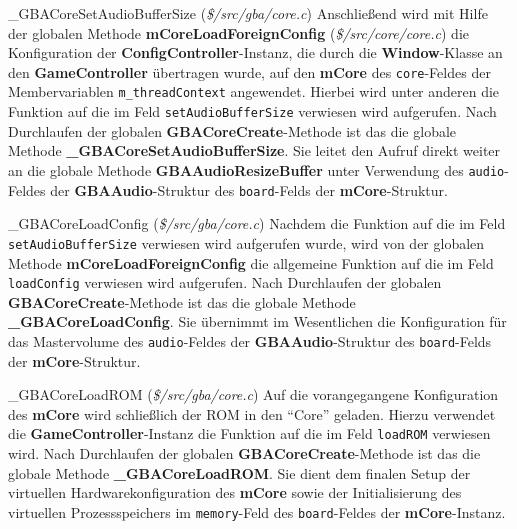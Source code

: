 \documentclass[11pt,a4paper]{scrartcl}
\begin{document}
\vspace{5mm}
\large {\_}GBACoreSetAudioBufferSize \normalsize(\textit{\$/src/gba/core.c})
\vspace{2mm}\newline
Anschlie{\ss}end wird mit Hilfe der globalen Methode \textbf{mCoreLoadForeignConfig} (\textit{\$/src/core/core.c}) die Konfiguration der \textbf{ConfigController}-Instanz, die durch die \textbf{Window}-Klasse an den \textbf{GameController} \"ubertragen wurde, auf den \textbf{mCore} des \verb|core|-Feldes der Membervariablen \verb|m_threadContext| angewendet. Hierbei wird unter anderen die Funktion auf die im Feld \verb|setAudioBufferSize| verwiesen wird aufgerufen. Nach Durchlaufen der globalen \textbf{GBACoreCreate}-Methode ist das die globale Methode \textbf{{\_}GBACoreSetAudioBufferSize}. Sie leitet den Aufruf direkt weiter an die globale Methode \textbf{GBAAudioResizeBuffer} unter Verwendung des \verb|audio|-Feldes der \textbf{GBAAudio}-Struktur des \verb|board|-Felds der \textbf{mCore}-Struktur.

\vspace{5mm}
\large {\_}GBACoreLoadConfig \normalsize(\textit{\$/src/gba/core.c})
\vspace{2mm}\newline
Nachdem die Funktion auf die im Feld \verb|setAudioBufferSize| verwiesen wird aufgerufen wurde, wird von der globalen Methode \textbf{mCoreLoadForeignConfig} die allgemeine Funktion auf die im Feld \verb|loadConfig| verwiesen wird aufgerufen. Nach Durchlaufen der globalen \textbf{GBACoreCreate}-Methode ist das die globale Methode \textbf{{\_}GBACoreLoadConfig}. Sie \"ubernimmt im Wesentlichen die Konfiguration f\"ur das Mastervolume des \verb|audio|-Feldes der \textbf{GBAAudio}-Struktur des \verb|board|-Felds der \textbf{mCore}-Struktur.

\vspace{5mm}
\large {\_}GBACoreLoadROM \normalsize(\textit{\$/src/gba/core.c})
\vspace{2mm}\newline
Auf die vorangegangene Konfiguration des \textbf{mCore} wird schlie{\ss}lich der ROM in den \enquote{Core} geladen. Hierzu verwendet die \textbf{GameController}-Instanz die Funktion auf die im Feld \verb|loadROM| verwiesen wird. Nach Durchlaufen der globalen \textbf{GBACoreCreate}-Methode ist das die globale Methode \textbf{{\_}GBACoreLoadROM}. Sie dient dem finalen Setup der virtuellen Hardwarekonfiguration des \textbf{mCore} sowie der Initialisierung des virtuellen Prozessspeichers im \verb|memory|-Feld des \verb|board|-Feldes der \textbf{mCore}-Instanz.
\end{document}
